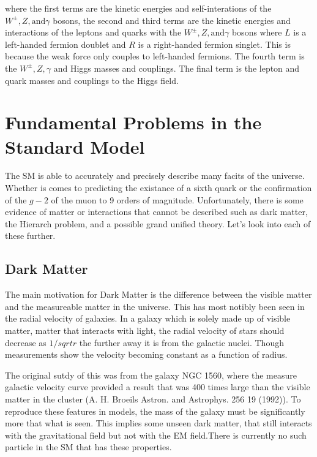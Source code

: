where the first terms are the kinetic energies and self-interations of the $W^\pm,Z, \text{and} \gamma$ bosons, the second and third terms are the kinetic energies and interactions of the leptons and quarks with the $W^\pm,Z, \text{and} \gamma$ bosons where $L$ is a left-handed fermion doublet and $R$ is a right-handed fermion singlet. This is because the weak force only couples to left-handed fermions. The fourth term is the $W^\pm,Z,\gamma$ and Higgs masses and couplings. The final term is the lepton and quark masses and couplings to the Higgs field.  

\section{Fundamental Problems in the Standard Model}
\label{sec:SMIssues}

The SM is able to accurately and precisely describe many facits of the universe. Whether is comes to predicting the existance of a sixth quark or the confirmation of the $g - 2$ of the muon to 9 orders of magnitude. Unfortunately, there is some evidence of matter or interactions that cannot be described such as dark matter, the Hierarch problem, and a possible grand unified theory. Let's look into each of these further.

\subsection{Dark Matter}
The main motivation for Dark Matter is the difference between the visible matter and the measureable matter in the universe. This has most notibly been seen in the radial velocity of galaxies. In a galaxy which is solely made up of visible matter, matter that interacts with light, the radial velocity of stars should decrease as $1/sqrt{r}$ the further away it is from the galactic nuclei. Though measurements show the velocity becoming constant as a function of radius.

The original sutdy of this was from the galaxy NGC 1560, where the measure galactic velocity curve provided a result that was 400 times large than the visible matter in the cluster (A. H. Broeils Astron. and Astrophys. 256 19 (1992)).  To reproduce these features in models, the mass of the galaxy must be significantly more that what is seen. This implies some unseen dark matter, that still interacts with the gravitational field but not with the EM field.There is currently no such particle in the SM that has these properties.

